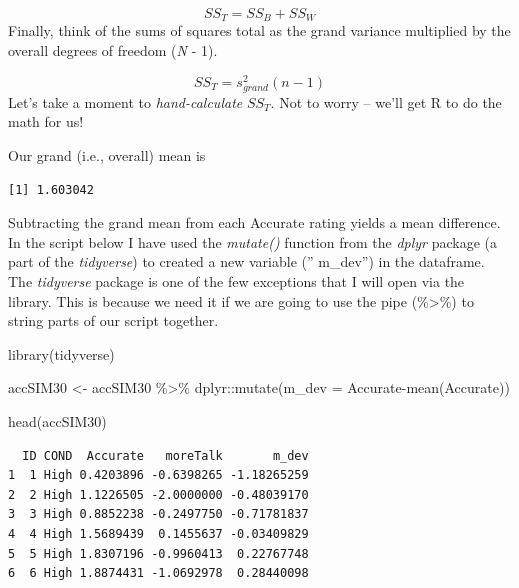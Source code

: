 \documentclass[
  11pt,
]{book}
\newenvironment{Shaded}{\begin{snugshade}}{\end{snugshade}}
\newcommand{\AttributeTok}[1]{\textcolor[rgb]{0.77,0.63,0.00}{#1}}
\newcommand{\FunctionTok}[1]{\textcolor[rgb]{0.00,0.00,0.00}{#1}}
\newcommand{\NormalTok}[1]{#1}
\newcommand{\OtherTok}[1]{\textcolor[rgb]{0.56,0.35,0.01}{#1}}
\newcommand{\SpecialCharTok}[1]{\textcolor[rgb]{0.00,0.00,0.00}{#1}}
\begin{document}
\[SS_{T}= SS_{B} + SS_{W}\]
Finally, think of the sums of squares total as the grand variance multiplied by the overall degrees of freedom (\emph{N} - 1).

\[SS_{T}= s_{grand}^{2}(n-1)\]
Let's take a moment to \emph{hand-calculate} \(SS_{T}\). Not to worry -- we'll get R to do the math for us!

Our grand (i.e., overall) mean is

\begin{Shaded}
\end{Shaded}

\begin{verbatim}
[1] 1.603042
\end{verbatim}

Subtracting the grand mean from each Accurate rating yields a mean difference. In the script below I have used the \emph{mutate()} function from the \emph{dplyr} package (a part of the \emph{tidyverse}) to created a new variable ('' m\_dev'') in the dataframe. The \emph{tidyverse} package is one of the few exceptions that I will open via the library. This is because we need it if we are going to use the pipe (\%\textgreater\%) to string parts of our script together.

\begin{Shaded}
\begin{Highlighting}[]
\FunctionTok{library}\NormalTok{(tidyverse)}

\NormalTok{accSIM30 }\OtherTok{\textless{}{-}}\NormalTok{ accSIM30 }\SpecialCharTok{\%\textgreater{}\%} 
\NormalTok{  dplyr}\SpecialCharTok{::}\FunctionTok{mutate}\NormalTok{(}\AttributeTok{m\_dev =}\NormalTok{ Accurate}\SpecialCharTok{{-}}\FunctionTok{mean}\NormalTok{(Accurate))}

\FunctionTok{head}\NormalTok{(accSIM30)}
\end{Highlighting}
\end{Shaded}

\begin{verbatim}
  ID COND  Accurate   moreTalk       m_dev
1  1 High 0.4203896 -0.6398265 -1.18265259
2  2 High 1.1226505 -2.0000000 -0.48039170
3  3 High 0.8852238 -0.2497750 -0.71781837
4  4 High 1.5689439  0.1455637 -0.03409829
5  5 High 1.8307196 -0.9960413  0.22767748
6  6 High 1.8874431 -1.0692978  0.28440098
\end{verbatim}
\end{document}
